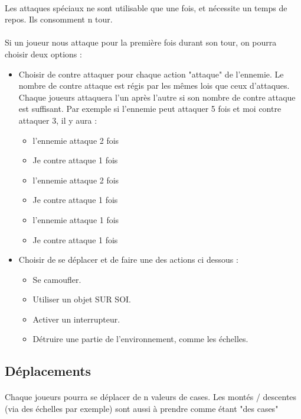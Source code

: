 \paragraph{} Les attaques spéciaux ne sont utilisable que une fois, et nécessite un temps de repos. Ils consomment n tour.

\paragraph{} Si un joueur nous attaque pour la première fois durant son tour, on pourra choisir deux options :
\begin{itemize}
	\item Choisir de contre attaquer pour chaque action "attaque" de l'ennemie. Le nombre de contre attaque est régis par les mêmes lois que ceux d'attaques. Chaque joueurs attaquera l'un après l'autre si son nombre de contre attaque est suffisant. Par exemple si l'ennemie peut attaquer 5 fois et moi contre attaquer 3, il y aura :
		\begin{itemize}
			\item l'ennemie attaque 2 fois
			\item Je contre attaque 1 fois
			\item l'ennemie attaque 2 fois
			\item Je contre attaque 1 fois
			\item l'ennemie attaque 1 fois
			\item Je contre attaque 1 fois
		\end{itemize}

	\item Choisir de se déplacer et de faire une des actions ci dessous :
		\begin{itemize}
			\item Se camoufler.
			\item Utiliser un objet SUR SOI.
			\item Activer un interrupteur.
			\item Détruire une partie de l'environnement, comme les échelles.
		\end{itemize}
\end{itemize}

\subsection{Déplacements}
\paragraph{} Chaque joueurs pourra se déplacer de n valeurs de cases. Les montés / descentes (via des échelles par exemple) sont aussi à prendre comme étant "des cases"


